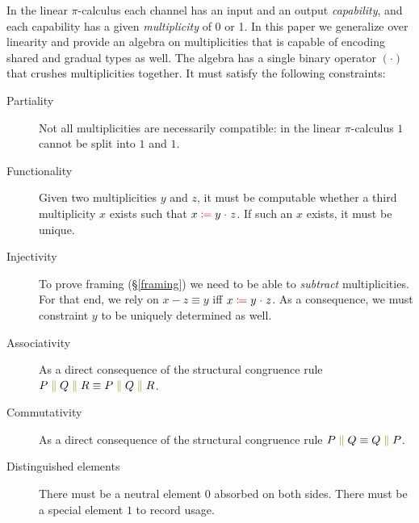 \documentclass[a4paper,UKenglish,cleveref, autoref, thm-restate,authorcolumns]{lipics-v2019}
\theoremstyle{definition}
\newcommand{\picalc}{$\pi$-calculus}
\newcommand{\constr}[1]{\textcolor{olive}{\mathtt{\operatorname{#1}}}}
\newcommand{\field}[1]{\textcolor{red}{\mathtt{\operatorname{#1}}}}
\newcommand{\comp}[2]{#1 \; \constr{\parallel} \; #2}
\newcommand{\op}[3]{#1 \; \field{\coloneqq} \; #2 \; \field{\cdot} \; #3}
\begin{document}
In the linear \picalc{} each channel has an input and an output \emph{capability}, and each capability has a given \emph{multiplicity} of 0 or 1.
In this paper we generalize over linearity and provide an algebra on multiplicities that is capable of encoding shared and gradual types as well.
The algebra has a single binary operator $(\cdot)$ that crushes multiplicities together.
It must satisfy the following constraints:
\begin{description}

\item [Partiality]
  Not all multiplicities are necessarily compatible: in the linear \picalc{} $1$ cannot be split into $1$ and $1$.
\item [Functionality]
  Given two multiplicities $y$ and $z$, it must be computable whether a third multiplicity $x$ exists such that $\op{x}{y}{z}$.
  If such an $x$ exists, it must be unique.
    
\item [Injectivity]
  To prove framing (\S \ref{framing}) we need to be able to \emph{subtract} multiplicities.
  For that end, we rely on $x - z \equiv y$ iff $\op{x}{y}{z}$.
  As a consequence, we must constraint $y$ to be uniquely determined as well.

\item [Associativity]
  As a direct consequence of the structural congruence rule $\comp{P}{\comp{Q}{R}} \equiv \comp{\comp{P}{Q}}{R}$.

\item [Commutativity]
  As a direct consequence of the structural congruence rule $\comp{P}{Q} \equiv \comp{Q}{P}$.

\item [Distinguished elements]
  There must be a neutral element $0$ absorbed on both sides.
  There must be a special element $1$ to record usage.
\end{description}
\end{document}
